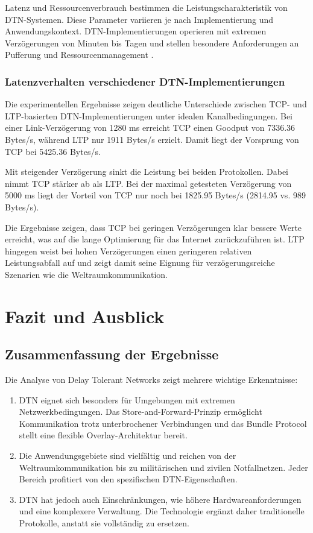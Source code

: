 \documentclass[paper=a4,fontsize=12pt,ngerman]{scrartcl}
\begin{document}
Latenz und Ressourcenverbrauch bestimmen die Leistungscharakteristik von DTN-Systemen. Diese Parameter variieren je nach Implementierung und Anwendungskontext. DTN-Implementierungen operieren mit extremen Verzögerungen von Minuten bis Tagen und stellen besondere Anforderungen an Pufferung und Ressourcenmanagement \cite{Fall03}.

\subsubsection{Latenzverhalten verschiedener DTN-Implementierungen}

Die experimentellen Ergebnisse zeigen deutliche Unterschiede zwischen TCP- und LTP-basierten DTN-Implementierungen unter idealen Kanalbedingungen.
Bei einer Link-Verzögerung von 1280 ms erreicht TCP einen Goodput von 7336.36 Bytes/s, während LTP nur 1911 Bytes/s erzielt.
Damit liegt der Vorsprung von TCP bei 5425.36 Bytes/s.

Mit steigender Verzögerung sinkt die Leistung bei beiden Protokollen. Dabei nimmt TCP stärker ab als LTP. Bei der maximal getesteten Verzögerung von 5000 ms liegt der Vorteil von TCP nur noch bei 1825.95 Bytes/s (2814.95 vs. 989 Bytes/s).

Die Ergebnisse zeigen, dass TCP bei geringen Verzögerungen klar bessere Werte erreicht, was auf die lange Optimierung für das Internet zurückzuführen ist.
LTP hingegen weist bei hohen Verzögerungen einen geringeren relativen Leistungsabfall auf und zeigt damit seine Eignung für verzögerungsreiche Szenarien wie die Weltraumkommunikation.
\newpage
\section{Fazit und Ausblick}

\subsection{Zusammenfassung der Ergebnisse}
Die Analyse von Delay Tolerant Networks zeigt mehrere wichtige Erkenntnisse:

\begin{enumerate}
    \item DTN eignet sich besonders für Umgebungen mit extremen Netzwerkbedingungen. Das Store-and-Forward-Prinzip ermöglicht Kommunikation trotz unterbrochener Verbindungen und das Bundle Protocol stellt eine flexible Overlay-Architektur bereit.

    \item Die Anwendungsgebiete sind vielfältig und reichen von der Weltraumkommunikation bis zu militärischen und zivilen Notfallnetzen. Jeder Bereich profitiert von den spezifischen DTN-Eigenschaften.

    \item DTN hat jedoch auch Einschränkungen, wie höhere Hardwareanforderungen und eine komplexere Verwaltung. Die Technologie ergänzt daher traditionelle Protokolle, anstatt sie vollständig zu ersetzen.
\end{enumerate}
\end{document}
